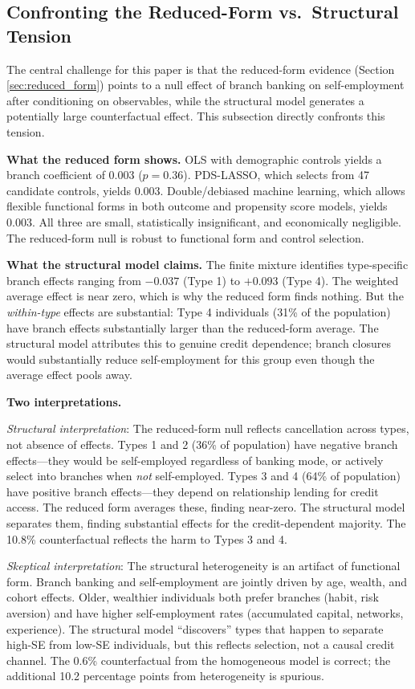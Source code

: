 \documentclass[12pt]{article}
\begin{document}
\subsection{Confronting the Reduced-Form vs.\ Structural Tension}

The central challenge for this paper is that the reduced-form evidence (Section \ref{sec:reduced_form}) points to a null effect of branch banking on self-employment after conditioning on observables, while the structural model generates a potentially large counterfactual effect. This subsection directly confronts this tension.

\textbf{What the reduced form shows.} OLS with demographic controls yields a branch coefficient of 0.003 ($p = 0.36$). PDS-LASSO, which selects from 47 candidate controls, yields 0.003. Double/debiased machine learning, which allows flexible functional forms in both outcome and propensity score models, yields 0.003. All three are small, statistically insignificant, and economically negligible. The reduced-form null is robust to functional form and control selection.

\textbf{What the structural model claims.} The finite mixture identifies type-specific branch effects ranging from $-0.037$ (Type 1) to $+0.093$ (Type 4). The weighted average effect is near zero, which is why the reduced form finds nothing. But the \textit{within-type} effects are substantial: Type 4 individuals (31\% of the population) have branch effects substantially larger than the reduced-form average. The structural model attributes this to genuine credit dependence; branch closures would substantially reduce self-employment for this group even though the average effect pools away.

\textbf{Two interpretations.}

\textit{Structural interpretation}: The reduced-form null reflects cancellation across types, not absence of effects. Types 1 and 2 (36\% of population) have negative branch effects---they would be self-employed regardless of banking mode, or actively select into branches when \textit{not} self-employed. Types 3 and 4 (64\% of population) have positive branch effects---they depend on relationship lending for credit access. The reduced form averages these, finding near-zero. The structural model separates them, finding substantial effects for the credit-dependent majority. The 10.8\% counterfactual reflects the harm to Types 3 and 4.

\textit{Skeptical interpretation}: The structural heterogeneity is an artifact of functional form. Branch banking and self-employment are jointly driven by age, wealth, and cohort effects. Older, wealthier individuals both prefer branches (habit, risk aversion) and have higher self-employment rates (accumulated capital, networks, experience). The structural model ``discovers'' types that happen to separate high-SE from low-SE individuals, but this reflects selection, not a causal credit channel. The 0.6\% counterfactual from the homogeneous model is correct; the additional 10.2 percentage points from heterogeneity is spurious.
\end{document}
